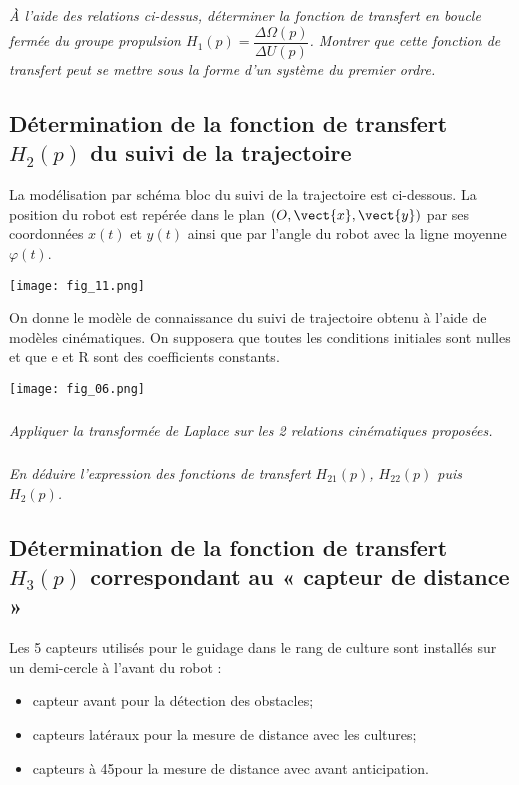 \begin{multicols}{2}
\subparagraph{}
\textit{À l’aide des relations ci-dessus, déterminer la fonction de transfert en boucle fermée du groupe propulsion 
$H_1(p)=\dfrac{\Delta\Omega(p)}{\Delta U(p)}$. 
Montrer que cette fonction de transfert peut se mettre sous la forme d’un système du premier ordre.}
\ifprof
\begin{corrige}
\end{corrige}
\else
\fi



\subsection*{Détermination de la fonction de transfert $H_2 (p)$ du suivi de la trajectoire}

\ifprof
\else
La modélisation par schéma bloc du suivi de la trajectoire est ci-dessous. La position du robot est repérée dans le plan $\left(O,\vect{x},\vect{y}\right)$ par ses coordonnées $x(t)$ et $y(t)$ ainsi que par l’angle du robot avec la ligne moyenne $\varphi(t)$. 

\begin{center}
\texttt{[image: fig\_11.png]}
\end{center}


On donne le modèle de connaissance du suivi de trajectoire obtenu à l’aide de modèles cinématiques. On supposera que toutes les conditions initiales sont nulles et que e et R sont des coefficients constants. 

\begin{center}
\texttt{[image: fig\_06.png]}
\end{center}

\fi

\subparagraph{}
\textit{Appliquer la transformée de Laplace sur les 2 relations cinématiques proposées. }
\ifprof
\begin{corrige}
\end{corrige}
\else
\fi


\subparagraph{}
\textit{ En déduire l’expression des  fonctions de transfert $H_{21} (p)$, $H_{22} (p)$ puis $H_2 (p)$.  }
\ifprof
\begin{corrige}
\end{corrige}
\else
\fi

 \subsection*{Détermination de la fonction de transfert $H_3 (p)$ correspondant au « capteur de distance » }
\ifprof
\else
Les 5 capteurs utilisés pour le guidage dans le  rang de culture sont installés sur un demi-cercle à l’avant du robot : 
\begin{itemize}
\item capteur avant pour la détection des obstacles;
\item capteurs latéraux pour la mesure de distance avec les cultures;
\item capteurs à 45\degres pour la mesure de distance avec avant  anticipation. 
\end{itemize}


\end{multicols}

